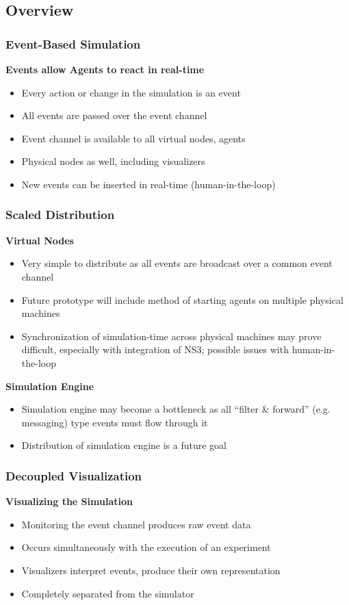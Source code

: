 \documentclass[mathserif,usenames,dvipsnames]{beamer}
\begin{document}
\subsection{Overview}
\frame
{
    \frametitle{Event-Based Simulation}
    \textbf{Events allow Agents to react in real-time}
    \begin{itemize}
        \item Every action or change in the simulation is an event
        \item All events are passed over the event channel
        \item Event channel is available to all virtual nodes, agents
        \item Physical nodes as well, including visualizers
        \item New events can be inserted in real-time (human-in-the-loop)
    \end{itemize}
}

\frame
{
    \frametitle{Scaled Distribution}
    \textbf{Virtual Nodes}
    \begin{itemize}
	\item Very simple to distribute as all events are broadcast over a common event channel
	\item Future prototype will include method of starting agents on multiple physical machines
	\item Synchronization of simulation-time across physical machines may prove difficult, especially with integration of NS3; possible issues with human-in-the-loop
    \end{itemize}
    \textbf{Simulation Engine}
    \begin{itemize}
	\item Simulation engine may become a bottleneck as all ``filter \& forward'' (e.g. messaging) type events must flow through it
	\item Distribution of simulation engine is a future goal 
    \end{itemize}
}

\frame
{
    \frametitle{Decoupled Visualization}
    \textbf{Visualizing the Simulation}
    \begin{itemize}
        \item Monitoring the event channel produces raw event data
        \item Occurs simultaneously with the execution of an experiment
        \item Visualizers interpret events, produce their own representation 
        \item Completely separated from the simulator
    \end{itemize}
}
\end{document}
